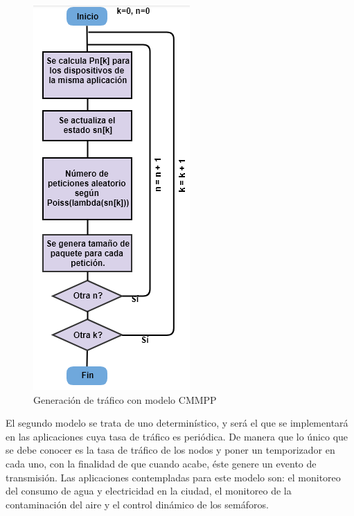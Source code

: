 \begin{figure}[th]
\centering
\includegraphics[scale=.7]{Figures/Generación de tráfico con modelo CMMPP}
\decoRule
\caption[Generación de tráfico con modelo CMMPP]{Generación de tráfico con modelo CMMPP}
\label{fig:CMMPP_Algoritmo}
\end{figure}

El segundo modelo se trata de uno determinístico, y será el que se implementará en las aplicaciones cuya tasa de tráfico es periódica. De manera que lo único que se debe conocer es la tasa de tráfico de los nodos y poner un temporizador en cada uno, con la finalidad de que cuando acabe, éste genere un evento de transmisión. Las aplicaciones contempladas para este modelo son: el monitoreo del consumo de agua y electricidad en la ciudad, el monitoreo de la contaminación del aire y el control dinámico de los semáforos.\newline


